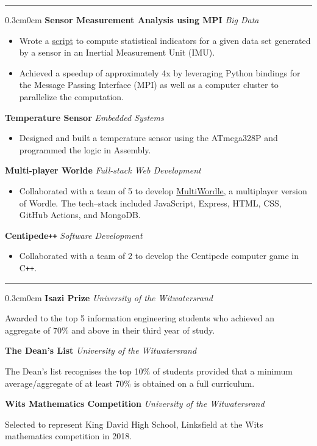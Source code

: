 \documentclass[10pt, a4paper]{article}
\newcommand{\location}[1]{\textit{#1}}
\newcommand{\contentType}[1]{\textit{#1}}
\newcommand{\heading}[1]{
\makebox[0pt][l]{\Large \sc \hspace{2pt}#1}
\rule[-0.7ex]{\columnwidth}{0.5pt}\vspace{1.0ex}
}
\newcommand{\subheading}[1]{{\bfseries #1}}
\newcommand{\subheadSkip}{\vspace{0.7ex}}
\newenvironment{mysection}[1]
{\vspace{2.5ex}
\heading{#1}
\begin{adjustwidth}{0.3cm}{0cm}}
{\end{adjustwidth} }
\begin{document}
\begin{mysection}{Projects}
 \subheadSkip
 \subheading{Sensor Measurement Analysis using MPI} \hfill \contentType{Big Data}
\begin{itemize}
    \item Wrote a \href{https://github.com/RyanSelesnik/Big-data-project}{script} to compute statistical indicators for a given data set generated by a sensor in an Inertial Measurement Unit (IMU).
    \item Achieved a speedup of approximately 4x by leveraging Python bindings for the Message Passing Interface (MPI) as well as a computer cluster to parallelize the computation.
\end{itemize}
 \subheadSkip
 \subheading{Temperature Sensor} \hfill \contentType{Embedded Systems}
\begin{itemize}
    \item Designed and built a temperature sensor using the ATmega328P and programmed the logic in Assembly.
\end{itemize}
 \subheadSkip
 \subheading{Multi-player Worlde} \hfill \contentType{Full-stack Web Development}
\begin{itemize}
    \item Collaborated with a team of 5 to develop \href{https://github.com/witseie-elen4010/2022-group-lab-001}{MultiWordle}, a multiplayer version of Wordle. The tech--stack included JavaScript, Express, HTML, CSS, GitHub Actions, and MongoDB. 
\end{itemize}
 \subheadSkip

 \subheading{Centipede\texttt{++}} \hfill \contentType{Software Development}
\begin{itemize}
    \item Collaborated with a team of 2 to develop the Centipede computer game in C\texttt{++}.
\end{itemize}


\end{mysection}

\begin{mysection}{Honours and Awards}
\subheadSkip
\subheading{Isazi Prize} \hfill \location{University of the Witwatersrand}


\hspace{1em} Awarded to the top 5 information engineering students who achieved an aggregate of 70\% and above in their third year of study.

\subheadSkip
\subheading{The Dean's List} \hfill \location{University of the Witwatersrand}

\hspace{1em} The Dean's list recognises the top 10\% of students provided that a minimum average/aggregate of at least 70\% is obtained on a full curriculum.

\subheadSkip
\subheading{Wits Mathematics Competition} \hfill \location{University of the Witwatersrand}

\hspace{1em} Selected to represent King David High School, Linksfield  at the Wits mathematics competition in 2018. 

\end{mysection}
\end{document}
